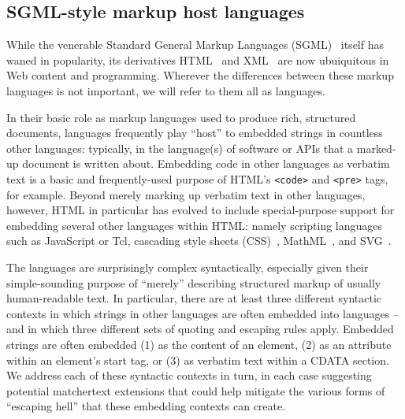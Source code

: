 \subsection{SGML-style markup host languages}

While the venerable
Standard General Markup Languages (SGML)~\cite{iso8879sgml}
itself has waned in popularity,
its derivatives HTML~\cite{whatwg22html} and XML~\cite{w3c08xml}
are now ubuiquitous in Web content and programming.
Wherever the differences between these markup languages is not important,
we will refer to them all as \ml languages.

In their basic role as markup languages
used to produce rich, structured documents,
\ml languages frequently play ``host'' to embedded strings
in countless other languages:
typically, in the language(s) of software or APIs
that a marked-up document is written about.
Embedding code in other languages as verbatim text
is a basic and frequently-used purpose of HTML's
\verb|<code>| and \verb|<pre>| tags,
for example.
Beyond merely marking up verbatim text in other languages, however,
HTML in particular has evolved to include special-purpose support
for embedding several other languages within HTML:
namely scripting languages such as JavaScript or Tcl,
cascading style sheets (CSS)~\cite{XXX},
MathML~\cite{XXX},
and SVG~\cite{XXX}.

The \ml languages are surprisingly complex syntactically,
especially given their simple-sounding purpose
of ``merely'' describing structured markup of usually human-readable text.
In particular,
there are at least three different syntactic contexts
in which strings in other languages are often embedded
into \ml languages --
and in which three different sets of quoting and escaping rules apply.
Embedded strings are often embedded
(1) as the content of an element,
(2) as an attribute within an element's start tag, or
(3) as verbatim text within a CDATA section.
We address each of these syntactic contexts in turn,
in each case suggesting potential matchertext extensions
that could help mitigate the various forms of ``escaping hell''
that these embedding contexts can create.

